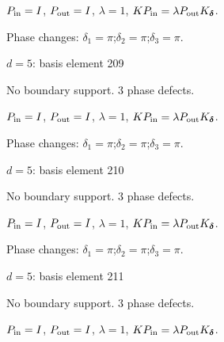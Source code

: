 \vspace{-1mm}
$P_{\rm in}=I$, \quad $P_{\rm out}=I$, \quad $\lambda=1$, \qquad $K P_{\rm in}=\lambda P_{\rm out}K_{\boldsymbol\delta}$.
\par\smallskip\begin{minipage}{.98\linewidth}\small Phase changes: $\delta_{1}=\pi$;\quad $\delta_{2}=\pi$;\quad $\delta_{3}=\pi$.\end{minipage}
\vfill
{\footnotesize\texttt{}}
\newpage
{}
{\Large $d=5$: basis element 209}\par
No boundary support. 3 phase defects.
\begin{center}
\end{center}
\vspace{-1mm}
$P_{\rm in}=I$, \quad $P_{\rm out}=I$, \quad $\lambda=1$, \qquad $K P_{\rm in}=\lambda P_{\rm out}K_{\boldsymbol\delta}$.
\par\smallskip\begin{minipage}{.98\linewidth}\small Phase changes: $\delta_{1}=\pi$;\quad $\delta_{2}=\pi$;\quad $\delta_{3}=\pi$.\end{minipage}
\vfill
{\footnotesize\texttt{}}
\newpage
{}
{\Large $d=5$: basis element 210}\par
No boundary support. 3 phase defects.
\begin{center}
\end{center}
\vspace{-1mm}
$P_{\rm in}=I$, \quad $P_{\rm out}=I$, \quad $\lambda=1$, \qquad $K P_{\rm in}=\lambda P_{\rm out}K_{\boldsymbol\delta}$.
\par\smallskip\begin{minipage}{.98\linewidth}\small Phase changes: $\delta_{1}=\pi$;\quad $\delta_{2}=\pi$;\quad $\delta_{3}=\pi$.\end{minipage}
\vfill
{\footnotesize\texttt{}}
\newpage
{}
{\Large $d=5$: basis element 211}\par
No boundary support. 3 phase defects.
\begin{center}
\end{center}
\vspace{-1mm}
$P_{\rm in}=I$, \quad $P_{\rm out}=I$, \quad $\lambda=1$, \qquad $K P_{\rm in}=\lambda P_{\rm out}K_{\boldsymbol\delta}$.
